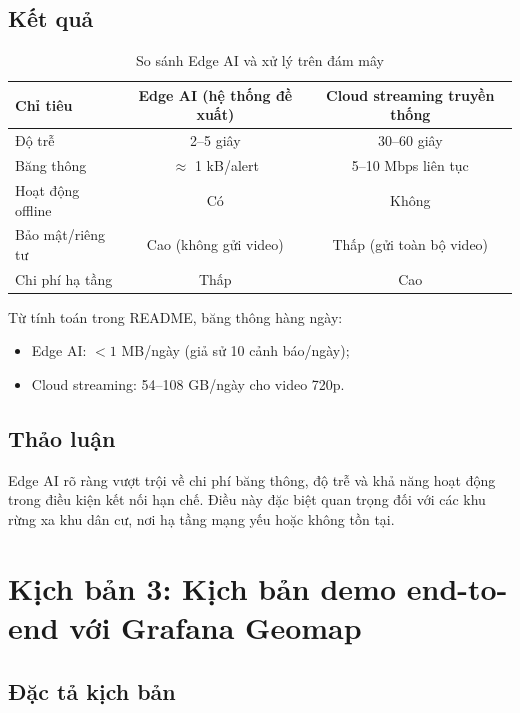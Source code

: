 \documentclass[12pt,a4paper]{report}
\begin{document}
\subsection{Kết quả}

\begin{table}[h]
  \centering
  \caption{So sánh Edge AI và xử lý trên đám mây}
  \begin{tabular}{lcc}
    \toprule
    Chỉ tiêu & Edge AI (hệ thống đề xuất) & Cloud streaming truyền thống \\
    \midrule
    Độ trễ & 2--5 giây & 30--60 giây \\
    Băng thông & $\approx$ 1 kB/alert & 5--10 Mbps liên tục \\
    Hoạt động offline & Có & Không \\
    Bảo mật/riêng tư & Cao (không gửi video) & Thấp (gửi toàn bộ video) \\
    Chi phí hạ tầng & Thấp & Cao \\
    \bottomrule
  \end{tabular}
\end{table}

Từ tính toán trong README, băng thông hàng ngày:
\begin{itemize}
  \item Edge AI: $< 1$ MB/ngày (giả sử 10 cảnh báo/ngày);
  \item Cloud streaming: 54--108 GB/ngày cho video 720p.
\end{itemize}

\subsection{Thảo luận}

Edge AI rõ ràng vượt trội về chi phí băng thông, độ trễ và khả năng hoạt động trong điều kiện kết nối hạn chế. Điều này đặc biệt quan trọng đối với các khu rừng xa khu dân cư, nơi hạ tầng mạng yếu hoặc không tồn tại.

\section{Kịch bản 3: Kịch bản demo end-to-end với Grafana Geomap}

\subsection{Đặc tả kịch bản}
\end{document}

